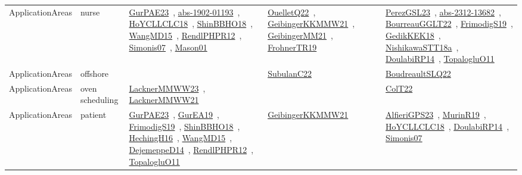 {\begin{longtable}{lp{3cm}>{\raggedright\arraybackslash}p{6cm}>{\raggedright\arraybackslash}p{6cm}>{\raggedright\arraybackslash}p{8cm}}
ApplicationAreas & nurse & \href{articles/GurPAE23.pdf}{GurPAE23}~\cite{GurPAE23}, \href{articles/abs-1902-01193.pdf}{abs-1902-01193}~\cite{abs-1902-01193}, \href{papers/HoYCLLCLC18.pdf}{HoYCLLCLC18}~\cite{HoYCLLCLC18}, \href{articles/ShinBBHO18.pdf}{ShinBBHO18}~\cite{ShinBBHO18}, \href{articles/WangMD15.pdf}{WangMD15}~\cite{WangMD15}, \href{papers/RendlPHPR12.pdf}{RendlPHPR12}~\cite{RendlPHPR12}, \href{articles/Simonis07.pdf}{Simonis07}~\cite{Simonis07}, \href{articles/Mason01.pdf}{Mason01}~\cite{Mason01} & \href{papers/OuelletQ22.pdf}{OuelletQ22}~\cite{OuelletQ22}, \href{papers/GeibingerKKMMW21.pdf}{GeibingerKKMMW21}~\cite{GeibingerKKMMW21}, \href{papers/GeibingerMM21.pdf}{GeibingerMM21}~\cite{GeibingerMM21}, \href{papers/FrohnerTR19.pdf}{FrohnerTR19}~\cite{FrohnerTR19} & \href{papers/PerezGSL23.pdf}{PerezGSL23}~\cite{PerezGSL23}, \href{articles/abs-2312-13682.pdf}{abs-2312-13682}~\cite{abs-2312-13682}, \href{articles/BourreauGGLT22.pdf}{BourreauGGLT22}~\cite{BourreauGGLT22}, \href{papers/FrimodigS19.pdf}{FrimodigS19}~\cite{FrimodigS19}, \href{articles/GedikKEK18.pdf}{GedikKEK18}~\cite{GedikKEK18}, \href{papers/NishikawaSTT18a.pdf}{NishikawaSTT18a}~\cite{NishikawaSTT18a}, \href{papers/DoulabiRP14.pdf}{DoulabiRP14}~\cite{DoulabiRP14}, \href{articles/TopalogluO11.pdf}{TopalogluO11}~\cite{TopalogluO11}\\
ApplicationAreas & offshore &  & \href{articles/SubulanC22.pdf}{SubulanC22}~\cite{SubulanC22} & \href{papers/BoudreaultSLQ22.pdf}{BoudreaultSLQ22}~\cite{BoudreaultSLQ22}\\
ApplicationAreas & oven scheduling & \href{articles/LacknerMMWW23.pdf}{LacknerMMWW23}~\cite{LacknerMMWW23}, \href{papers/LacknerMMWW21.pdf}{LacknerMMWW21}~\cite{LacknerMMWW21} &  & \href{articles/ColT22.pdf}{ColT22}~\cite{ColT22}\\
ApplicationAreas & patient & \href{articles/GurPAE23.pdf}{GurPAE23}~\cite{GurPAE23}, \href{articles/GurEA19.pdf}{GurEA19}~\cite{GurEA19}, \href{papers/FrimodigS19.pdf}{FrimodigS19}~\cite{FrimodigS19}, \href{articles/ShinBBHO18.pdf}{ShinBBHO18}~\cite{ShinBBHO18}, \href{papers/HechingH16.pdf}{HechingH16}~\cite{HechingH16}, \href{articles/WangMD15.pdf}{WangMD15}~\cite{WangMD15}, \href{papers/DejemeppeD14.pdf}{DejemeppeD14}~\cite{DejemeppeD14}, \href{papers/RendlPHPR12.pdf}{RendlPHPR12}~\cite{RendlPHPR12}, \href{articles/TopalogluO11.pdf}{TopalogluO11}~\cite{TopalogluO11} & \href{papers/GeibingerKKMMW21.pdf}{GeibingerKKMMW21}~\cite{GeibingerKKMMW21} & \href{articles/AlfieriGPS23.pdf}{AlfieriGPS23}~\cite{AlfieriGPS23}, \href{papers/MurinR19.pdf}{MurinR19}~\cite{MurinR19}, \href{papers/HoYCLLCLC18.pdf}{HoYCLLCLC18}~\cite{HoYCLLCLC18}, \href{papers/DoulabiRP14.pdf}{DoulabiRP14}~\cite{DoulabiRP14}, \href{articles/Simonis07.pdf}{Simonis07}~\cite{Simonis07}\\

\end{longtable}}

